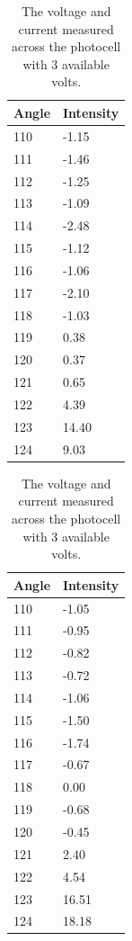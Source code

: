 \documentclass[a4paper]{article}
\begin{document}
\begin{table}[H]
  \caption{The voltage and current measured across the photocell with 3
    available volts.}
  \begin{center}
    \begin{tabular}{|l|l|}
      \hline
      Angle & Intensity \\
      \hline
      110 & -1.15 \\
      111 & -1.46 \\
      112 & -1.25 \\
      113 & -1.09 \\
      114 & -2.48 \\
      115 & -1.12 \\
      116 & -1.06 \\
      117 & -2.10 \\
      118 & -1.03 \\
      119 & 0.38 \\
      120 & 0.37 \\
      121 & 0.65 \\
      122 & 4.39 \\
      123 & 14.40 \\
      124 & 9.03 \\
      \hline
    \end{tabular}
  \end{center}
\end{table}

\begin{table}[H]
  \caption{The voltage and current measured across the photocell with 3
    available volts.}
  \begin{center}
    \begin{tabular}{|l|l|}
      \hline
      Angle & Intensity \\
      \hline
      110 & -1.05 \\
      111 & -0.95 \\
      112 & -0.82 \\
      113 & -0.72 \\
      114 & -1.06 \\
      115 & -1.50 \\
      116 & -1.74 \\
      117 & -0.67 \\
      118 & 0.00 \\
      119 & -0.68 \\
      120 & -0.45 \\
      121 & 2.40 \\
      122 & 4.54 \\
      123 & 16.51 \\
      124 & 18.18 \\
      \hline
    \end{tabular}
  \end{center}
\end{table}
\end{document}
